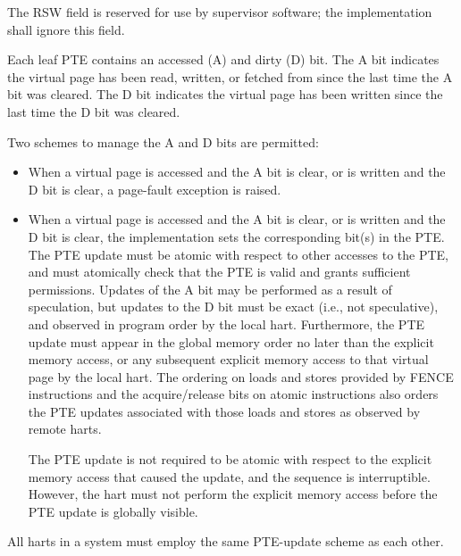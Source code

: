 The RSW field is reserved for use by supervisor software; the implementation
shall ignore this field.

Each leaf PTE contains an accessed (A) and dirty (D) bit.  The A bit indicates
the virtual page has been read, written, or fetched from since the last time
the A bit was cleared.  The D bit indicates the virtual page has been written
since the last time the D bit was cleared.

Two schemes to manage the A and D bits are permitted:
\begin{itemize}
\item When a virtual page is accessed and the A bit is clear, or is
      written and the D bit is clear, a page-fault exception is raised.

\item When a virtual page is accessed and the A bit is clear, or is
      written and the D bit is clear, the implementation sets the
      corresponding bit(s) in the PTE.  The PTE update must be atomic with
      respect to other accesses to the PTE, and must atomically check
      that the PTE is valid and grants sufficient permissions.  Updates
      of the A bit may be performed as a result of speculation, but updates
      to the D bit must be exact (i.e., not speculative), and observed
      in program order by the local hart.  Furthermore, the PTE update
      must appear in the global memory order no later than the explicit
      memory access, or any subsequent explicit memory access to that
      virtual page by the local hart.  The ordering on loads and stores
      provided by FENCE instructions and the acquire/release bits on atomic
      instructions also orders the PTE updates associated with those loads
      and stores as observed by remote harts.

      The PTE update is not required to be atomic with respect to the explicit
      memory access that caused the update, and the sequence is interruptible.
      However, the hart must not perform the explicit memory access before the
      PTE update is globally visible.
\end{itemize}
All harts in a system must employ the same PTE-update scheme as each other.

